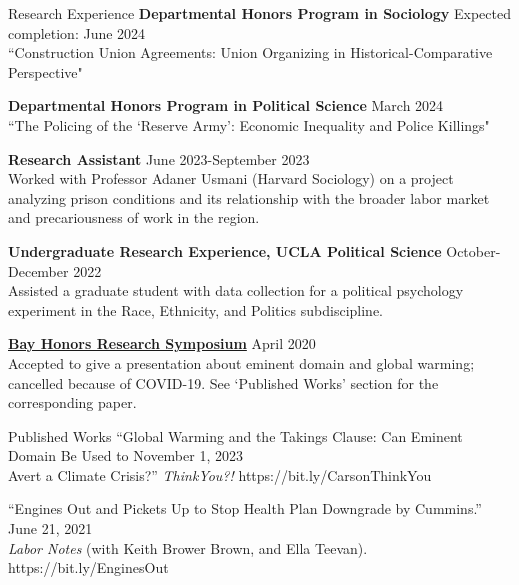 \documentclass[
	11pt, %
]{resume} %
\begin{document}
\begin{samepage}
\begin{rSection}{Research Experience}
\textbf{Departmental Honors Program in Sociology} \hfill Expected completion: June 2024\\
“Construction Union Agreements: Union Organizing in Historical-Comparative Perspective"

\textbf{Departmental Honors Program in Political Science} \hfill March 2024\\
“The Policing of the `Reserve Army': Economic Inequality and Police Killings"

\textbf{Research Assistant} \hfill June 2023-September 2023\\
Worked with Professor Adaner Usmani (Harvard Sociology) on a project analyzing prison conditions and its
relationship with the broader labor market and precariousness of work in the region.

\textbf{Undergraduate Research Experience, UCLA Political Science} \hfill October-December 2022\\
Assisted a graduate student with data collection for a political psychology experiment in the Race, Ethnicity, and Politics subdiscipline.

\href{https://bayhonors.org/}{\textbf{Bay Honors Research Symposium}} \hfill April 2020\\
Accepted to give a presentation about eminent domain and global warming; cancelled because
of COVID-19. See ‘Published Works’ section for the corresponding paper.

\end{rSection}
\end{samepage}
\begin{samepage}
\begin{rSection}{Published Works}
“Global Warming and the Takings Clause: Can Eminent Domain Be Used to \hfill November 1, 2023 \\
Avert a Climate Crisis?” \textit{ThinkYou?!} https://bit.ly/CarsonThinkYou

“Engines Out and Pickets Up to Stop Health Plan Downgrade by Cummins.” \hfill June 21, 2021 \\
\textit{Labor Notes} (with Keith Brower Brown, and Ella Teevan). https://bit.ly/EnginesOut

\end{rSection}
\end{samepage}
\end{document}
